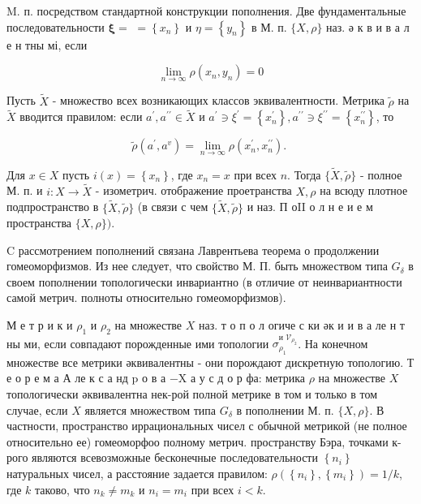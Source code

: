 \documentclass[10pt]{article}
\begin{document}
M. п. посредством стандартной конструкции пополнения. Две фундаментальные последовательности $\boldsymbol{\xi}=$ $=\left\{x_{n}\right\}$ и $\eta=\left\{y_{n}\right\}$ в М. п. $\{X, \rho\}$ наз. ә к в и в а л е н тны мі, если



\[

\lim _{n \rightarrow \infty} \rho\left(x_{n}, y_{n}\right)=0

\]



Пусть $\tilde{X}$ - множество всех возникающих классов эквивалентности. Метрика $\tilde{\rho}$ на $\tilde{X}$ вводится правилом: если $a^{\prime}, a^{\prime \prime} \in \tilde{X}$ и $a^{\prime} \ni \xi^{\prime}=\left\{x_{n}^{\prime}\right\}, a^{\prime \prime} \ni \xi^{\prime \prime}=\left\{x_{n}^{\prime \prime}\right\}$, то



\[

\tilde{\rho}\left(a^{\prime}, a^{v}\right)=\lim _{n \rightarrow \infty} \rho\left(x_{n}^{\prime}, x_{n}^{\prime \prime}\right) \text {. }

\]



Для $x \in X$ пусть $i(x)=\left\{x_{n}\right\}$, где $x_{n}=x$ при всех $n$. Тогда $\{\tilde{X}, \tilde{\rho}\}$ - полное М. п. и $i: X \rightarrow \tilde{X}$ - изометрич. отображение проетранства $X, \rho$ на всюду плотное подпространство в $\{\tilde{X}, \tilde{\rho}\}$ (в связи с чем $\{\tilde{X}, \tilde{\rho}\}$ и наз. П оII о л н е и е м пространства $\{X, \rho\})$.



$\mathrm{C}$ рассмотрением пополнений связана Лаврентьева теорема о продолжении гомеоморфизмов. Из нее следует, что свойство М. П. быть множеством типа $G_{\delta}$ в своем пополнении топологически инвариантно (в отличие от неинвариантности самой метрич. полноты относительно гомеоморфизмов).



М е т р и к и $\rho_{1}$ и $\rho_{2}$ на множестве $X$ наз. т о п о л огиче с ки әк и и в а ле н т ны ми, если совпадают порожденные ими топологии $\mathscr{\sigma}_{\rho_{1}}^{\text {и } \mathscr{V}_{\rho_{2}}}$. На конечном множестве все метрики әквивалентны - они порождают дискретную топологию. Т е о р е м а А ле к с а нд $\mathrm{p}$ о в а $-\mathrm{X}$ а у с д о р фа: метрика $\rho$ на множестве $X$ топологически әквивалентна нек-рой полной метрике в том и только в том случае, если $X$ является множеством типа $G_{\delta}$ в пополнении М. п. $\{X, \rho\}$. В частности, пространство иррациональных чисел с обычной метрикой (не полное относительно ее) гомеоморфоо полному метрич. пространству Бэра, точками к-рого являются всевозможные бесконечные последовательности $\left\{n_{i}\right\}$ натуральных чисел, а расстояние задается правилом: $\rho\left(\left\{n_{i}\right\},\left\{m_{i}\right\}\right)=1 / k$, где $k$ таково, что $n_{k} \neq m_{k}$ и $n_{i}=m_{i}$ при всех $i<k$.
\end{document}

